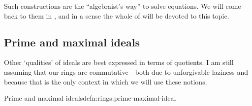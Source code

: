Such constructions are the ``algebraist's way'' to solve equations. We
will come back to them in
, and
in a sense the whole of  will be devoted to this
topic.

\subsection{Prime and maximal ideals}
\label{subsec:rings:prime-and-maximal-ideals}
Other `qualities' of ideals are best expressed in terms of
quotients. I am still assuming that our rings are commutative---both
due to unforgivable laziness and because that is the only context in
which we will use these notions.

\begin{defn}{Prime and maximal ideals}{defn:rings:prime-maximal-ideal}
\end{defn}

